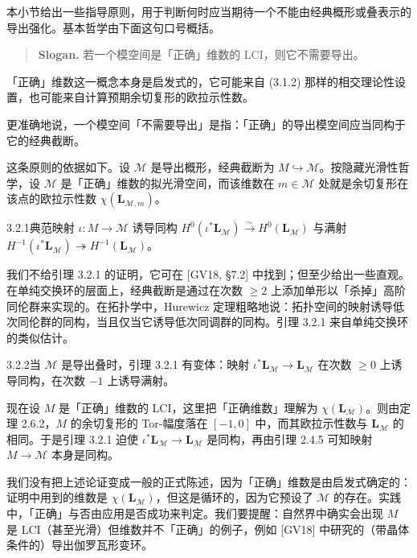 本小节给出一些指导原则，用于判断何时应当期待一个不能由经典概形或叠表示的导出强化。基本哲学由下面这句口号概括。
\begin{quote}
\textbf{Slogan.} 若一个模空间是「正确」维数的 LCI，则它不需要导出。
\end{quote}
「正确」维数这一概念本身是启发式的，它可能来自 (3.1.2) 那样的相交理论性设置，也可能来自计算预期余切复形的欧拉示性数。

更准确地说，一个模空间「不需要导出」是指：「正确」的导出模空间应当同构于它的经典截断。

这条原则的依据如下。设 $\mathcal M$ 是导出概形，经典截断为 $M\hookrightarrow\mathcal M$。按隐藏光滑性哲学，设 $\mathcal M$ 是「正确」维数的拟光滑空间，而该维数在 $m\in\mathcal M$ 处就是余切复形在该点的欧拉示性数 $\chi(\mathbf L_{\mathcal M,m})$。

\begin{lem}{3.2.1}典范映射 $\iota\colon M\to\mathcal M$ 诱导同构 $H^0(\iota^*\mathbf L_{\mathcal M})\xrightarrow{\sim}H^0(\mathbf L_{\mathcal M})$ 与满射 $H^{-1}(\iota^*\mathbf L_{\mathcal M})\twoheadrightarrow H^{-1}(\mathbf L_{\mathcal M})$。
\end{lem}

我们不给引理 3.2.1 的证明，它可在 [GV18, §7.2] 中找到；但至少给出一些直观。在单纯交换环的层面上，经典截断是通过在次数 $\ge2$ 上添加单形以「杀掉」高阶同伦群来实现的。在拓扑学中，Hurewicz 定理粗略地说：拓扑空间的映射诱导低次同伦群的同构，当且仅当它诱导低次同调群的同构。引理 3.2.1 来自单纯交换环的类似估计。

\begin{rem}{3.2.2}当 $\mathcal M$ 是导出叠时，引理 3.2.1 有变体：映射 $\iota^*\mathbf L_{\mathcal M}\to\mathbf L_{\mathcal M}$ 在次数 $\ge0$ 上诱导同构，在次数 $-1$ 上诱导满射。
\end{rem}

现在设 $M$ 是「正确」维数的 LCI，这里把「正确维数」理解为 $\chi(\mathbf L_{\mathcal M})$。则由定理 2.6.2，$M$ 的余切复形的 Tor-幅度落在 $[-1,0]$ 中，而其欧拉示性数与 $\mathbf L_{\mathcal M}$ 的相同。于是引理 3.2.1 迫使 $\iota^*\mathbf L_{\mathcal M}\to\mathbf L_{\mathcal M}$ 是同构，再由引理 2.4.5 可知映射 $M\to\mathcal M$ 本身是同构。

我们没有把上述论证变成一般的正式陈述，因为「正确」维数是由启发式确定的：证明中用到的维数是 $\chi(\mathbf L_{\mathcal M})$，但这是循环的，因为它预设了 $\mathcal M$ 的存在。实践中，「正确」与否由应用是否成功来判定。我们要提醒：自然界中确实会出现 $M$ 是 LCI（甚至光滑）但维数并不「正确」的例子，例如 [GV18] 中研究的（带晶体条件的）导出伽罗瓦形变环。

